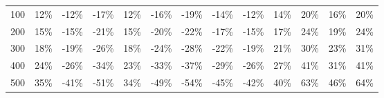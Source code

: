 \begin{sidewaystable}[p]
\begin{tabular}{@{}lrrrrrrrrrrrr@{}}
    100 & 12\% & -12\% & -17\% & 12\% & -16\% & -19\% & -14\% & -12\% & 14\% & 20\% & 16\% & 20\% \\
    200 & 15\% & -15\% & -21\% & 15\% & -20\% & -22\% & -17\% & -15\% & 17\% & 24\% & 19\% & 24\% \\
    300 & 18\% & -19\% & -26\% & 18\% & -24\% & -28\% & -22\% & -19\% & 21\% & 30\% & 23\% & 31\% \\
    400 & 24\% & -26\% & -34\% & 23\% & -33\% & -37\% & -29\% & -26\% & 27\% & 41\% & 31\% & 41\% \\
    500 & 35\% & -41\% & -51\% & 34\% & -49\% & -54\% & -45\% & -42\% & 40\% & 63\% & 46\% & 64\% \\
    \bottomrule
    \end{tabular}
    \\ 
\end{sidewaystable}


